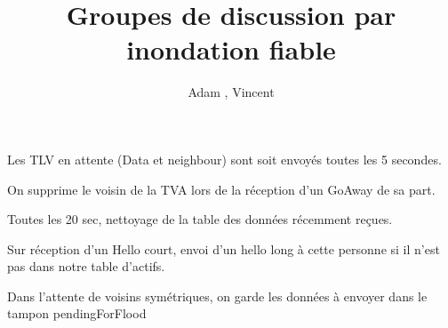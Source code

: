 \documentclass[12pt,a4paper]{article}
\title{Groupes de discussion par inondation fiable}
\author{Adam \bsc{Phillips}, Vincent \bsc{Bonczak}}
\begin{document}
  \maketitle
	
	
	Les TLV en attente (Data et neighbour) sont soit envoyés toutes les 5 secondes.
	
	On supprime le voisin de la TVA lors de la réception d'un GoAway de sa part.
	
	Toutes les 20 sec, nettoyage de la table des données récemment reçues.
	
	Sur réception d'un Hello court, envoi d'un hello long à cette personne si il n'est pas dans notre table d'actifs.
	
	Dans l'attente de voisins symétriques, on garde les données à envoyer dans le tampon pendingForFlood
	
\end{document}
